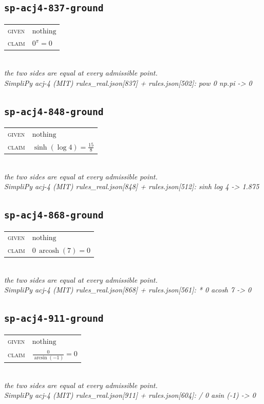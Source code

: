 \documentclass[11pt]{article}
\begin{document}
\subsection*{\texttt{sp-acj4-837-ground}}
\begin{tabular}{@{}l@{\quad}l@{}}
\textsc{given} & $\text{nothing}$ \\[4pt]
\textsc{claim} & $\displaystyle 0^{\pi} = 0$ \\
\end{tabular}\\[2pt]
{\small\emph{the two sides are equal at every admissible point.}}\\
\emph{SimpliPy acj-4 (MIT) rules\_real.json[837] + rules.json[502]: pow 0 np.pi  ->  0}\\

\subsection*{\texttt{sp-acj4-848-ground}}
\begin{tabular}{@{}l@{\quad}l@{}}
\textsc{given} & $\text{nothing}$ \\[4pt]
\textsc{claim} & $\displaystyle \sinh\left(\log 4\right) = \frac{15}{8}$ \\
\end{tabular}\\[2pt]
{\small\emph{the two sides are equal at every admissible point.}}\\
\emph{SimpliPy acj-4 (MIT) rules\_real.json[848] + rules.json[512]: sinh log 4  ->  1.875}\\

\subsection*{\texttt{sp-acj4-868-ground}}
\begin{tabular}{@{}l@{\quad}l@{}}
\textsc{given} & $\text{nothing}$ \\[4pt]
\textsc{claim} & $\displaystyle 0 \, \operatorname{arcosh}\left(7\right) = 0$ \\
\end{tabular}\\[2pt]
{\small\emph{the two sides are equal at every admissible point.}}\\
\emph{SimpliPy acj-4 (MIT) rules\_real.json[868] + rules.json[561]: * 0 acosh 7  ->  0}\\

\subsection*{\texttt{sp-acj4-911-ground}}
\begin{tabular}{@{}l@{\quad}l@{}}
\textsc{given} & $\text{nothing}$ \\[4pt]
\textsc{claim} & $\displaystyle \frac{0}{\arcsin\left(-1\right)} = 0$ \\
\end{tabular}\\[2pt]
{\small\emph{the two sides are equal at every admissible point.}}\\
\emph{SimpliPy acj-4 (MIT) rules\_real.json[911] + rules.json[604]: / 0 asin (-1)  ->  0}\\
\end{document}

